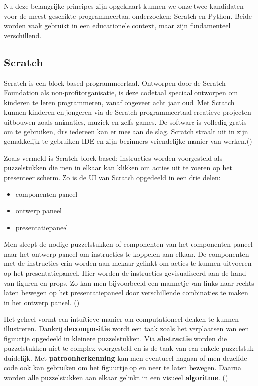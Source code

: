 Nu deze belangrijke principes zijn opgeklaart kunnen we onze twee kandidaten voor de meest geschikte programmeertaal onderzoeken: Scratch en Python. Beide worden vaak gebruikt in een educationele context, maar zijn fundamenteel verschillend. 

\subsection{Scratch}

Scratch is een block-based programmeertaal. Ontworpen door de Scratch Foundation als non-profitorganisatie, is deze codetaal speciaal ontworpen om kinderen te leren programmeren, vanaf ongeveer acht jaar oud. Met Scratch kunnen kinderen en jongeren via de Scratch programmeertaal creatieve projecten uitbouwen zoals animaties, muziek en zelfs games. De software is volledig gratis om te gebruiken, dus iedereen kan er mee aan de slag. Scratch straalt uit in zijn gemakkelijk te gebruiken IDE en zijn beginners vriendelijke manier van werken.(\cite{Weintrop2019,Maloney2010})

Zoals vermeld is Scratch block-based: instructies worden voorgesteld als puzzelstukken die men in elkaar kan klikken om acties uit te voeren op het presenteer scherm. Zo is de UI van Scratch opgedeeld in een drie delen:
\begin{itemize}
    \item componenten paneel
    \item ontwerp paneel
    \item presentatiepaneel
\end{itemize}

Men sleept de nodige puzzelstukken of componenten van het componenten paneel naar het ontwerp paneel om instructies te koppelen aan elkaar. De componenten met de instructies erin worden aan mekaar gelinkt om acties te kunnen uitvoeren op het presentatiepaneel. Hier worden de instructies gevisualiseerd aan de hand van figuren en props. Zo kan men bijvoorbeeld een mannetje van links naar rechts laten bewegen op het presentatiepaneel door verschillende combinaties te maken in het ontwerp paneel. (\cite{Maloney2010})

Het geheel vormt een intuïtieve manier om computationeel denken te kunnen illustreren. Dankzij \textbf{decompositie} wordt een taak zoals het verplaatsen van een figuurtje opgedeeld in kleinere puzzelstukken. Via \textbf{abstractie} worden die puzzelstukken niet te complex voorgesteld en is de taak van een enkele puzzelstuk duidelijk. Met \textbf{patroonherkenning} kan men eventueel nagaan of men dezelfde code ook kan gebruiken om het figuurtje op en neer te laten bewegen. Daarna worden alle puzzelstukken aan elkaar gelinkt in een visueel \textbf{algoritme}. (\cite{Maloney2010, Weintrop2019})

